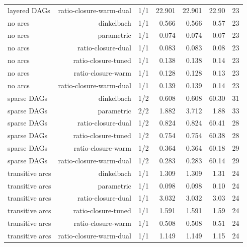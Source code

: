 {\begin{longtable}{lrrrrrr}
layered DAGs & ratio-closure-warm-dual & 1/1 & 22.901 & 22.901 & 22.90 & 23 \\
no arcs & dinkelbach & 1/1 & 0.566 & 0.566 & 0.57 & 23 \\
no arcs & parametric & 1/1 & 0.074 & 0.074 & 0.07 & 23 \\
no arcs & ratio-closure-dual & 1/1 & 0.083 & 0.083 & 0.08 & 23 \\
no arcs & ratio-closure-tuned & 1/1 & 0.138 & 0.138 & 0.14 & 23 \\
no arcs & ratio-closure-warm & 1/1 & 0.128 & 0.128 & 0.13 & 23 \\
no arcs & ratio-closure-warm-dual & 1/1 & 0.139 & 0.139 & 0.14 & 23 \\
sparse DAGs & dinkelbach & 1/2 & 0.608 & 0.608 & 60.30 & 31 \\
sparse DAGs & parametric & 2/2 & 1.882 & 3.712 & 1.88 & 33 \\
sparse DAGs & ratio-closure-dual & 1/2 & 0.824 & 0.824 & 60.41 & 28 \\
sparse DAGs & ratio-closure-tuned & 1/2 & 0.754 & 0.754 & 60.38 & 28 \\
sparse DAGs & ratio-closure-warm & 1/2 & 0.364 & 0.364 & 60.18 & 29 \\
sparse DAGs & ratio-closure-warm-dual & 1/2 & 0.283 & 0.283 & 60.14 & 29 \\
transitive arcs & dinkelbach & 1/1 & 1.309 & 1.309 & 1.31 & 24 \\
transitive arcs & parametric & 1/1 & 0.098 & 0.098 & 0.10 & 24 \\
transitive arcs & ratio-closure-dual & 1/1 & 3.032 & 3.032 & 3.03 & 24 \\
transitive arcs & ratio-closure-tuned & 1/1 & 1.591 & 1.591 & 1.59 & 24 \\
transitive arcs & ratio-closure-warm & 1/1 & 0.508 & 0.508 & 0.51 & 24 \\
transitive arcs & ratio-closure-warm-dual & 1/1 & 1.149 & 1.149 & 1.15 & 24 \\
\end{longtable}
}
